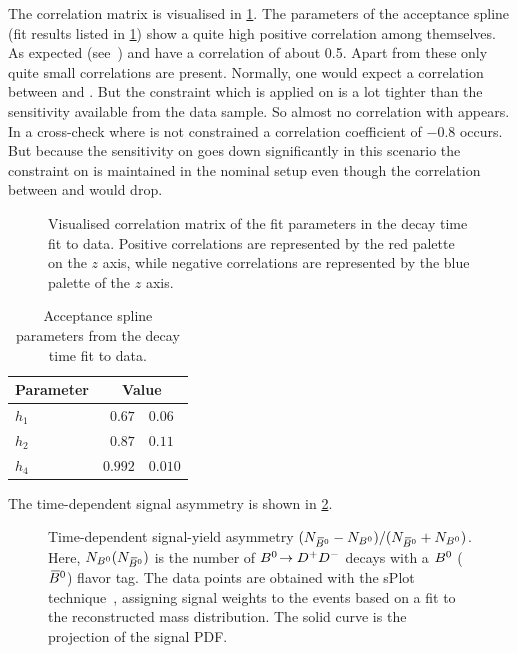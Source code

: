 The correlation matrix is visualised in
\cref{fig:b02dd:decaytimefit:FullFitCorrMatrixHotCold}. The parameters of the
acceptance spline (fit results listed in
\cref{tab:b02dd:decaytimefit:SplineAcceptanceFitResults}) show a quite high positive
correlation among themselves. As expected (see~\cite{LHCb-ANA-2011-004}) \SDD
and \CDD have a correlation of about 0.5. Apart from these only quite small
correlations are present. Normally, one would expect a correlation between \dm and \CDD.
But the constraint which is applied on \dm is a lot tighter than the
sensitivity available from the data sample. So almost no correlation with \CDD
appears. In a cross-check where \dm is not constrained a correlation
coefficient of \num{-0.8} occurs. But because the sensitivity on \CDD goes
down significantly in this scenario the constraint on \dm is maintained in
the nominal setup even though the correlation between \SDD and \CDD would drop.

\begin{figure}[!htb]
\centering
\caption{Visualised correlation matrix of the fit parameters in the decay time
fit to data. Positive correlations are represented by the red palette on the $z$ axis,
while negative correlations are represented by the blue palette of the $z$
axis.}
\label{fig:b02dd:decaytimefit:FullFitCorrMatrixHotCold}
\end{figure}

\begin{table}[!htb]
\caption{Acceptance spline parameters from the decay time fit to \BdToDD data.}
\label{tab:b02dd:decaytimefit:SplineAcceptanceFitResults}
\centering
\begin{tabular}{lr@{$\,\pm\,$}l}
  \toprule
  Parameter                     & \multicolumn{2}{c}{Value} \\
  \midrule
    $h_1$  & $0.67$  & $0.06$  \\
    $h_2$  & $0.87$  & $0.11$  \\
    $h_4$  & $0.992$ & $0.010$ \\
    \bottomrule
\end{tabular}
\end{table}

The time-dependent signal asymmetry is shown in \cref{fig:b02dd:decaytimefit:asymmetry}.
\begin{figure}[!htb]
\centering
% 
\caption{
Time-dependent signal-yield asymmetry $(N_{{{\kern 0.18em\overline{\kern -0.18em B}{}}{}^0}} - N_{{{B}^0}})/(N_{{{\kern 0.18em\overline{\kern -0.18em B}{}}{}^0}} +
N_{{{B}^0}})$. Here, $N_{{{B}^0}} (N_{{{\kern 0.18em\overline{\kern -0.18em B}{}}{}^0}})$ is the number of ${{B}^0}\!\rightarrow {\ensuremath{{D}^+}}{\ensuremath{{D}^-}}$ decays with
a ${{B}^0}$ (${{\kern 0.18em\overline{\kern -0.18em B}{}}{}^0}$) flavor tag. The data points are obtained with the sPlot
technique~\cite{Pivk:2004ty}, assigning signal weights to the events based on a
fit to the reconstructed mass distribution. The solid curve is the projection of
the signal PDF.}
\label{fig:b02dd:decaytimefit:asymmetry}
\end{figure}

